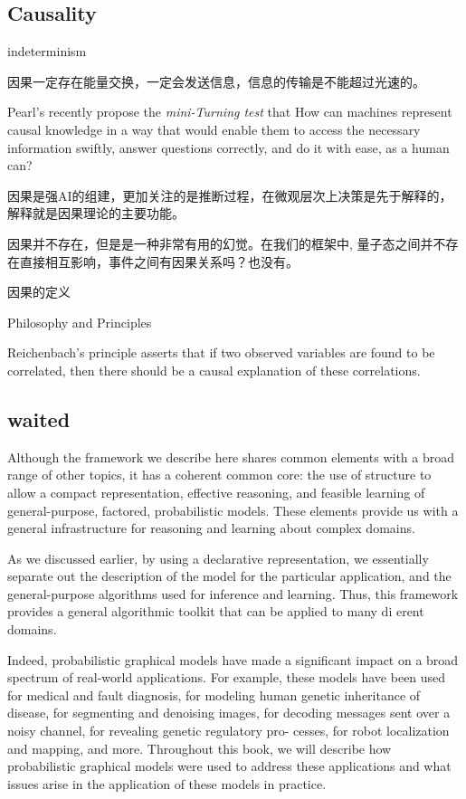 \documentclass[10pt,onecolumn,letterpaper]{article}
\begin{document}
\begin{CJK*}{UTF8}{gbsn}
\subsection{Causality}

indeterminism


因果一定存在能量交换，一定会发送信息，信息的传输是不能超过光速的。


Pearl's recently propose the \emph{mini-Turning test} that  How can machines represent causal knowledge in a way that would enable them to access the necessary information swiftly, answer questions correctly, and do it with ease, as a human can? 

因果是强AI的组建，更加关注的是推断过程，在微观层次上决策是先于解释的，解释就是因果理论的主要功能。


因果并不存在，但是是一种非常有用的幻觉。在我们的框架中, 量子态之间并不存在直接相互影响，事件之间有因果关系吗？也没有。

因果的定义

{Philosophy and Principles}

Reichenbach's principle asserts that if two observed variables are found to be correlated, then there should be a causal explanation of these correlations. 



\subsection{waited}

Although the framework we describe here shares common elements with a broad range of other topics, it has a coherent common core: the use of structure to allow a compact representation, effective reasoning, and feasible learning of general-purpose, factored, probabilistic models. These elements provide us with a general infrastructure for reasoning and learning about complex domains.


As we discussed earlier, by using a declarative representation, we essentially separate out the description of the model for the particular application, and the general-purpose algorithms used for inference and learning. Thus, this framework provides a general algorithmic toolkit that can be applied to many di erent domains.

Indeed, probabilistic graphical models have made a significant impact on a broad spectrum of real-world applications. For example, these models have been used for medical and fault diagnosis, for modeling human genetic inheritance of disease, for segmenting and denoising images, for decoding messages sent over a noisy channel, for revealing genetic regulatory pro- cesses, for robot localization and mapping, and more. Throughout this book, we will describe how probabilistic graphical models were used to address these applications and what issues arise in the application of these models in practice.


\end{CJK*}
\end{document}
